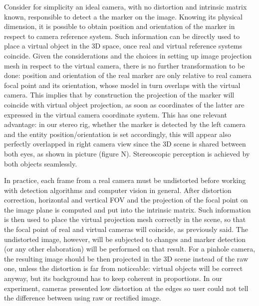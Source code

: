 Consider for simplicity an ideal camera, with no distortion and intrinsic matrix known, responsible to detect a the marker on the image. Knowing its physical dimension, it is possible to obtain position and orientation of the marker in respect to camera reference system. Such information can be directly used to place a virtual object in the 3D space, once real and virtual reference systems coincide. Given the considerations and the choices in setting up image projection mesh in respect to the virtual camera, there is no further transformation to be done: position and orientation of the real marker are only relative to real camera focal point and its orientation, whose model in turn overlaps with the virtual camera. This implies that by construction the projection of the marker will coincide with virtual object projection, as soon as coordinates of the latter are expressed in the virtual camera coordinate system. This has one relevant advantage: in our stereo rig, whether the marker is detected by the left camera and the entity position/orientation is set accordingly, this will appear also perfectly overlapped in right camera view since the 3D scene is shared between both eyes, as shown in picture (figure N). Stereoscopic perception is achieved by both objects seamlessly.

In practice, each frame from a real camera must be undistorted before working with detection algorithms and computer vision in general. After distortion correction, horizontal and vertical FOV and the projection of the focal point on the image plane is computed and put into the intrinsic matrix. Such information is then used to place the virtual projection mesh correctly in the scene, so that the focal point of real and virtual cameras will coincide, as previously said. The undistorted image, however, will be subjected to changes and marker detection (or any other elaboration) will be performed on that result. For a pinhole camera, the resulting image should be then projected in the 3D scene instead of the raw one, unless the distortion is far from noticeable: virtual objects will be correct anyway, but its background has to keep coherent in proportions. In our experiment, cameras presented low distortion at the edges so user could not tell the difference between using raw or rectified image.

